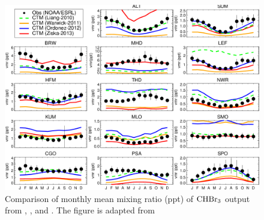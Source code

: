 \begin{figure}
    \centering
    \includegraphics[width =0.9\linewidth]{Appendix/images/Hossaini2013_fig5_bromoform.png}
    \caption{Comparison of monthly mean mixing ratio (ppt) of $\mathrm{CHBr_3}$ output from \cite{Liang2010}, \cite{ziska}, \cite{Warwick2006} and \cite{Ordonez2012}. The figure is adapted from \cite{Hossaini2013}}
    \label{fig:Hosaini_fig5}
\end{figure}
